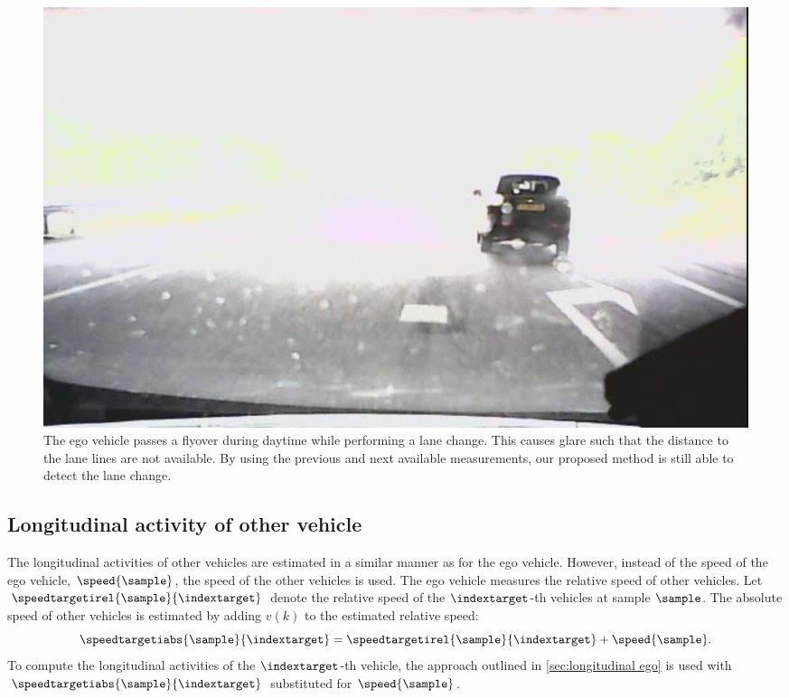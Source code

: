 \begin{figure}
	\centering
	\includegraphics[width=\linewidth]{figures/glare}
	\caption{\cstarta The ego vehicle passes a flyover during daytime while performing a lane change. This causes glare such that the distance to the lane lines are not available. By using the previous and next available measurements, our proposed method is still able to detect the lane change.\cenda}
	\label{fig:glare}
\end{figure}



\subsection{Longitudinal activity of other vehicle}
\label{sec:longitudinal other vehicles}

The longitudinal activities of other vehicles are estimated in a similar manner as for the ego vehicle. However, instead of the speed of the ego vehicle, $\speed{\sample}$, the speed of the other vehicles is used. The ego vehicle measures the relative speed of other vehicles. Let $\speedtargetirel{\sample}{\indextarget}$ denote the relative speed of the $\indextarget$-th vehicles at sample $\sample$. The absolute speed of other vehicles is estimated by adding $v(k)$ to the estimated relative speed:
\begin{equation}
	\speedtargetiabs{\sample}{\indextarget} = \speedtargetirel{\sample}{\indextarget} + \speed{\sample}.
\end{equation}
To compute the longitudinal activities of the $\indextarget$-th vehicle, the approach outlined in \cref{sec:longitudinal ego} is used with $\speedtargetiabs{\sample}{\indextarget}$ substituted for $\speed{\sample}$. 

